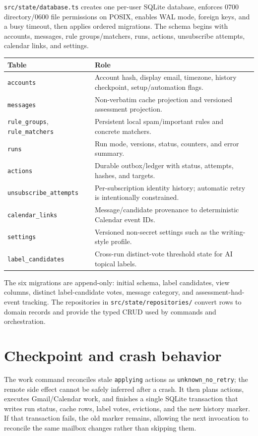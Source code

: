 \documentclass[12pt,oneside]{book}
\newcommand{\code}[1]{\nolinkurl{#1}}
\newcommand{\file}[1]{\nolinkurl{#1}}
\begin{document}
\file{src/state/database.ts} creates one per-user SQLite database, enforces 0700 directory/0600 file permissions on POSIX, enables WAL mode, foreign keys, and a busy timeout, then applies ordered migrations. The schema begins with accounts, messages, rule groups/matchers, runs, actions, unsubscribe attempts, calendar links, and settings.

\begin{center}
\begingroup\small
\begin{tabularx}{\textwidth}{P{3.4cm}Y}
\toprule
\textbf{Table} & \textbf{Role} \\
\midrule
\code{accounts} & Account hash, display email, timezone, history checkpoint, setup/automation flags. \\
\code{messages} & Non-verbatim cache projection and versioned assessment projection. \\
\code{rule_groups}, \code{rule_matchers} & Persistent local spam/important rules and concrete matchers. \\
\code{runs} & Run mode, versions, status, counters, and error summary. \\
\code{actions} & Durable outbox/ledger with status, attempts, hashes, and targets. \\
\code{unsubscribe_attempts} & Per-subscription identity history; automatic retry is intentionally constrained. \\
\code{calendar\_links} & Message/candidate provenance to deterministic Calendar event IDs. \\
\code{settings} & Versioned non-secret settings such as the writing-style profile. \\
\code{label_candidates} & Cross-run distinct-vote threshold state for AI topical labels. \\
\bottomrule
\end{tabularx}
\endgroup
\end{center}

The six migrations are append-only: initial schema, label candidates, view columns, distinct label-candidate votes, message category, and assessment-had-event tracking. The repositories in \file{src/state/repositories/} convert rows to domain records and provide the typed CRUD used by commands and orchestration.

\section{Checkpoint and crash behavior}

The work command reconciles stale \code{applying} actions as \code{unknown_no_retry}; the remote side effect cannot be safely inferred after a crash. It then plans actions, executes Gmail/Calendar work, and finishes a single SQLite transaction that writes run status, cache rows, label votes, evictions, and the new history marker. If that transaction fails, the old marker remains, allowing the next invocation to reconcile the same mailbox changes rather than skipping them.
\end{document}
